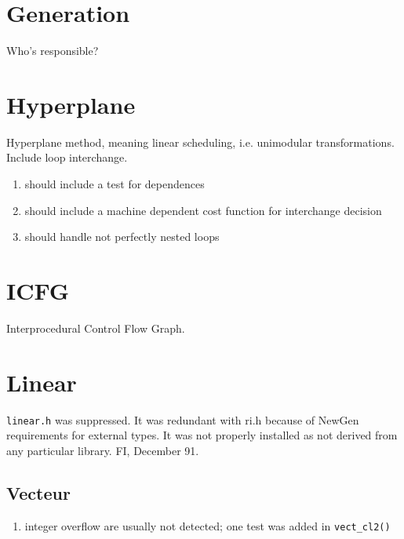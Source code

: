 \section{Generation}

Who's responsible?

\section{Hyperplane}

Hyperplane method, meaning linear scheduling, i.e. unimodular transformations.
Include loop interchange.

\begin{enumerate}

  \item {} should include a test for dependences

  \item {} should include a machine dependent cost 
function for interchange decision

  \item should handle not perfectly nested loops
\end{enumerate}

\section{ICFG}

Interprocedural Control Flow Graph.

\section{Linear}

\verb+linear.h+ was suppressed. It was redundant with ri.h because
of NewGen requirements for external types. It was not properly
installed as not derived from any particular library. FI, December 91.

\subsection{Vecteur}

\begin{enumerate}

  \item integer overflow are usually not detected; one test was
        added in \verb+vect_cl2()+

\end{enumerate}

